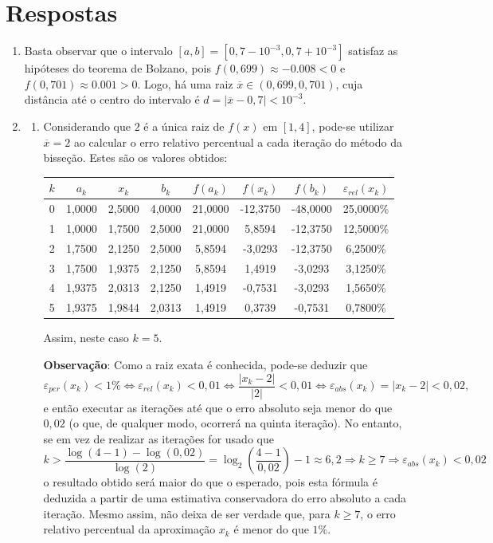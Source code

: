 \documentclass[12pt,a4paper]{article}
\begin{document}
\newpage
\section*{Respostas}
\begin{enumerate}
\item Basta observar que o intervalo $[a,b] = [0,7-10^{-3}, 0,7+10^{-3}]$ satisfaz as hipóteses do teorema de Bolzano, pois $f(0,699) \approx -0.008 < 0$ e $f(0,701) \approx 0.001 > 0$. Logo, há uma raiz $\overline{x} \in (0,699, 0,701)$, cuja distância até o centro do intervalo é $d = |\overline{x} - 0,7| < 10^{-3}$.

\item
\begin{enumerate}
\item Considerando que $2$ é a única raiz de $f(x)$ em $[1, 4]$, pode-se utilizar $\overline{x} = 2$ ao calcular o erro relativo percentual a cada iteração do método da bisseção. Estes são os valores obtidos:

\begin{tabular}{cccccccc}
\hline
$k$ & $a_k$ & $x_k$ & $b_k$ & $f(a_k)$ & $f(x_k)$ & $f(b_k)$ & $\varepsilon_{rel}(x_k)$ \\
\hline
0 & 1,0000 & 2,5000 & 4,0000 & 21,0000 & -12,3750 & -48,0000 & 25,0000\% \\
1 & 1,0000 & 1,7500 & 2,5000 & 21,0000 &   5,8594 & -12,3750 & 12,5000\%\\
2 & 1,7500 & 2,1250 & 2,5000 &  5,8594 &  -3,0293 & -12,3750 &  6,2500\%\\
3 & 1,7500 & 1,9375 & 2,1250 &  5,8594 &   1,4919 &  -3,0293 &  3,1250\%\\
4 & 1,9375 & 2,0313 & 2,1250 &  1,4919 &  -0,7531 &  -3,0293 &  1,5650\%\\
5 & 1,9375 & 1,9844 & 2,0313 &  1,4919 &   0,3739 &  -0,7531 &  0,7800\%\\
\hline
\end{tabular}

Assim, neste caso $k = 5$.

\textbf{Observação}: Como a raiz exata é conhecida, pode-se deduzir que
\[
\varepsilon_{per}(x_k) < 1\%
\Leftrightarrow
\varepsilon_{rel}(x_k) < 0,01
\Leftrightarrow
\frac{|x_k - 2|}{|2|} < 0,01
\Leftrightarrow
\varepsilon_{abs}(x_k) = |x_k - 2| < 0,02,
\]
e então executar as iterações até que o erro absoluto seja menor do que $0,02$ (o que, de qualquer modo, ocorrerá na quinta iteração). No entanto, se em vez de realizar as iterações for usado que
\[
k > \frac{\log(4-1)-\log(0,02)}{\log(2)} = \log_2 \left(\frac{4-1}{0,02}\right)-1 \approx 6,2
\Rightarrow
k \geq 7
\Rightarrow
\varepsilon_{abs}(x_k) < 0,02
\]
o resultado obtido será maior do que o esperado, pois esta fórmula é deduzida a partir de uma estimativa conservadora do erro absoluto a cada iteração. Mesmo assim, não deixa de ser verdade que, para $k\geq 7$, o erro relativo percentual da aproximação $x_k$ é menor do que $1\%$.


\end{enumerate}
\end{enumerate}
\end{document}
